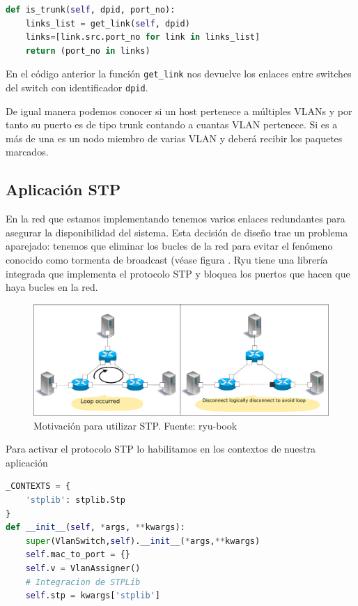 \begin{lstlisting}[language=Python, label=lst:is-trunk, caption={Función que determina si un puerto es de tipo trunk}]
def is_trunk(self, dpid, port_no):
    links_list = get_link(self, dpid)
    links=[link.src.port_no for link in links_list]
    return (port_no in links)
\end{lstlisting}

En el código anterior la función \lstinline{get_link} nos devuelve los enlaces entre switches del switch con identificador \lstinline{dpid}.

De igual manera podemos conocer si un host pertenece a múltiples VLANs y por tanto su puerto es de tipo trunk contando a cuantas VLAN pertenece. Si es a más de una es un nodo miembro de varias VLAN y deberá recibir los paquetes marcados.


\subsection{Aplicación STP}

En la red que estamos implementando tenemos varios enlaces redundantes para asegurar la disponibilidad del sistema. Esta decisión de diseño trae un problema aparejado: tenemos que eliminar los bucles de la red para evitar el fenómeno conocido como tormenta de broadcast (véase figura  \cite{Spanning33:online}. Ryu tiene una librería integrada que implementa el protocolo STP y bloquea los puertos que hacen que haya bucles en la red.

\begin{figure}[!h]
    \centering
    \includegraphics[width=\textwidth]{imagenes/figuras/stp.png}
    \caption{Motivación para utilizar STP. Fuente: ryu-book \cite{Spanning54:online}}
    \label{fig:motivacion-stp}
\end{figure}

Para activar el protocolo STP lo habilitamos en los contextos de nuestra aplicación

\begin{lstlisting}[language=Python, label=lst:stp-enable, caption={Activación del protocolo STP}]
_CONTEXTS = {
    'stplib': stplib.Stp
}
def __init__(self, *args, **kwargs):
    super(VlanSwitch,self).__init__(*args,**kwargs)
    self.mac_to_port = {}
    self.v = VlanAssigner()
    # Integracion de STPLib
    self.stp = kwargs['stplib']
\end{lstlisting}

